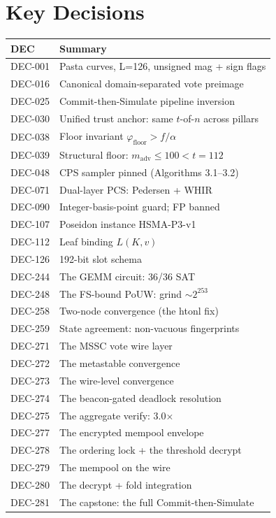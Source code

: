 \documentclass[11pt, a4paper]{article}
\begin{document}
\appendix

\section{Key Decisions}

\begin{longtable}{l p{12cm}}
\toprule
\textbf{DEC} & \textbf{Summary} \\
\midrule
\endhead
DEC-001 & Pasta curves, L=126, unsigned mag + sign flags \\
DEC-016 & Canonical domain-separated vote preimage \\
DEC-025 & Commit-then-Simulate pipeline inversion \\
DEC-030 & Unified trust anchor: same $t$-of-$n$ across pillars \\
DEC-038 & Floor invariant $\varphi_{\text{floor}} > f/\alpha$ \\
DEC-039 & Structural floor: $m_{\text{adv}} \le 100 < t = 112$ \\
DEC-048 & CPS sampler pinned (Algorithms 3.1--3.2) \\
DEC-071 & Dual-layer PCS: Pedersen + WHIR \\
DEC-090 & Integer-basis-point guard; FP banned \\
DEC-107 & Poseidon instance HSMA-P3-v1 \\
DEC-112 & Leaf binding $L(K, v)$ \\
DEC-126 & 192-bit slot schema \\
DEC-244 & The GEMM circuit: 36/36 SAT \\
DEC-248 & The FS-bound PoUW: grind $\sim 2^{253}$ \\
DEC-258 & Two-node convergence (the htonl fix) \\
DEC-259 & State agreement: non-vacuous fingerprints \\
DEC-271 & The MSSC vote wire layer \\
DEC-272 & The metastable convergence \\
DEC-273 & The wire-level convergence \\
DEC-274 & The beacon-gated deadlock resolution \\
DEC-275 & The aggregate verify: 3.0$\times$ \\
DEC-277 & The encrypted mempool envelope \\
DEC-278 & The ordering lock + the threshold decrypt \\
DEC-279 & The mempool on the wire \\
DEC-280 & The decrypt + fold integration \\
DEC-281 & The capstone: the full Commit-then-Simulate \\
\bottomrule
\end{longtable}
\end{document}
